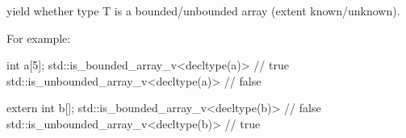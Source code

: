 




yield whether type T is a bounded/unbounded array (extent known/unknown).

For example:

\begin{cpp}
int a[5];
std::is_bounded_array_v<decltype(a)> // true
std::is_unbounded_array_v<decltype(a)> // false

extern int b[];
std::is_bounded_array_v<decltype(b)> // false
std::is_unbounded_array_v<decltype(b)> // true
\end{cpp}



























